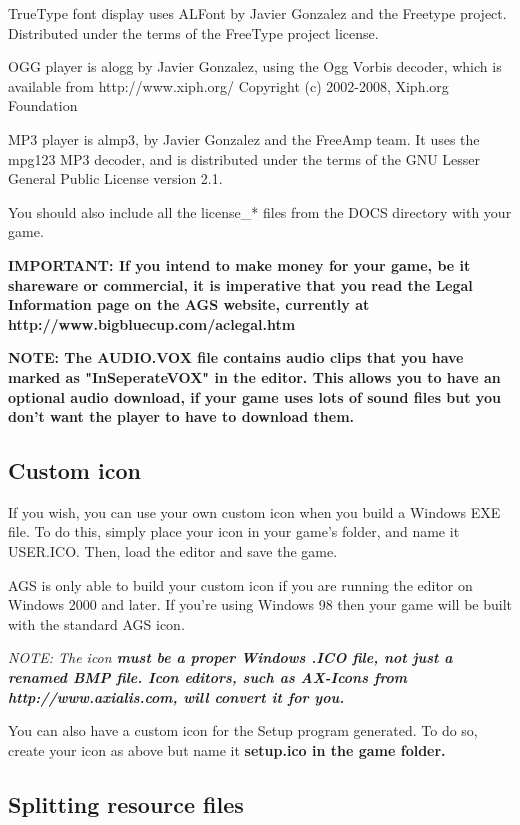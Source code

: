 TrueType font display uses ALFont by Javier Gonzalez and the Freetype project. Distributed
under the terms of the FreeType project license.

OGG player is alogg by Javier Gonzalez, using the Ogg Vorbis decoder, which is available
from http://www.xiph.org/  Copyright (c) 2002-2008, Xiph.org Foundation

MP3 player is almp3, by Javier Gonzalez and the FreeAmp team. It uses the mpg123 MP3 decoder,
and is distributed under the terms of the GNU Lesser General Public License version 2.1.

You should also include all the license_* files from the DOCS directory with your game.

\bf{IMPORTANT:} If you intend to make money for your game, be it shareware or commercial,
it is imperative that you read the Legal Information page on the AGS website, currently
at http://www.bigbluecup.com/aclegal.htm

\bf{NOTE:} The AUDIO.VOX file contains audio clips that you have marked as "InSeperateVOX"
in the editor. This allows you to have an optional audio download, if your game uses lots
of sound files but you don't want the player to have to download them.


\subsection{Custom icon}%

If you wish, you can use your own custom icon when you build a Windows EXE
file. To do this, simply place your icon in your game's folder, and name
it USER.ICO. Then, load the editor and save the game.

AGS is only able to build your custom icon if you are running the editor on
Windows 2000 and later. If you're using Windows 98 then your game will be
built with the standard AGS icon.

\it{NOTE: The icon \bf{must} be a proper Windows .ICO file, \bf{not} just a renamed
BMP file. Icon editors, such as AX-Icons from http://www.axialis.com, will convert
it for you.}

You can also have a custom icon for the Setup program generated. To do so, create
your icon as above but name it \bf{setup.ico} in the game folder.

\subsection{Splitting resource files}\label{SplitRes}%


